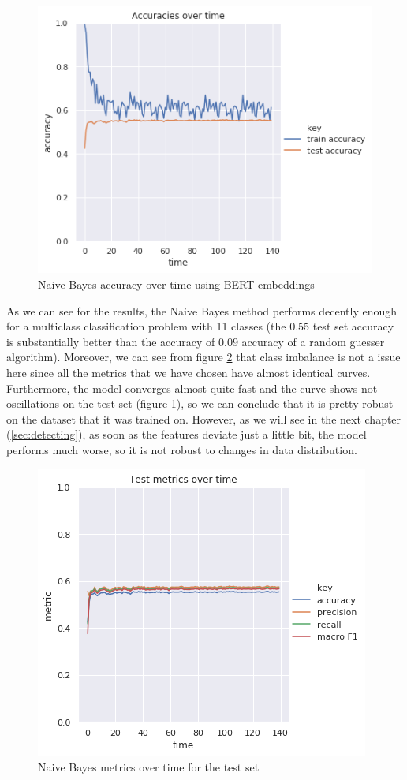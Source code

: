 \documentclass[12pt]{extreport}
\begin{document}
\begin{figure}[ht!]
\centering
\includegraphics[width=0.8\linewidth]{assets/framework/nb_BERT_accuracy_holdout.png}
\caption{Naive Bayes accuracy over time using BERT embeddings}
\label{fig:nb-acc}
\end{figure}

As we can see for the results, the Naive Bayes method performs decently enough for a multiclass classification problem with 11 classes (the $0.55$ test set accuracy is substantially better than the accuracy of $0.09$ accuracy of a random guesser algorithm). Moreover, we can see from figure \ref{fig:nb-metrics} that class imbalance is not a issue here since all the metrics that we have chosen have almost identical curves. Furthermore, the model converges almost quite fast and the curve shows not oscillations on the test set (figure \ref{fig:nb-acc}), so we can conclude that it is pretty robust on the dataset that it was trained on. However, as we will see in the next chapter (\ref{sec:detecting}), as soon as the features deviate just a little bit, the model performs much worse, so it is not robust to changes in data distribution.

\begin{figure}[H]
\centering
\includegraphics[width=0.8\linewidth]{assets/framework/nb_BERT_test_metrics_holdout.png}
\caption{Naive Bayes metrics over time for the test set}
\label{fig:nb-metrics}
\end{figure}
\end{document}
